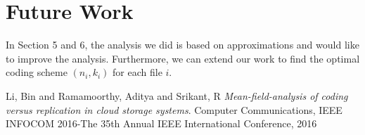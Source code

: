 \documentclass{article}
\begin{document}
\section{Future Work}
In Section 5 and 6, the analysis we did is based on approximations and would like to improve the analysis. Furthermore, we can extend our work to find the optimal coding scheme $(n_{i},k_{i})$ for each file $i$.

\begin{thebibliography}{9}
	Li, Bin and Ramamoorthy, Aditya and Srikant, R
	\textit{Mean-field-analysis of coding versus replication in cloud storage systems}. 
	Computer Communications, IEEE INFOCOM 2016-The 35th Annual IEEE International Conference, 2016
\end{thebibliography}









 



 



	  
	
	
\end{document}
